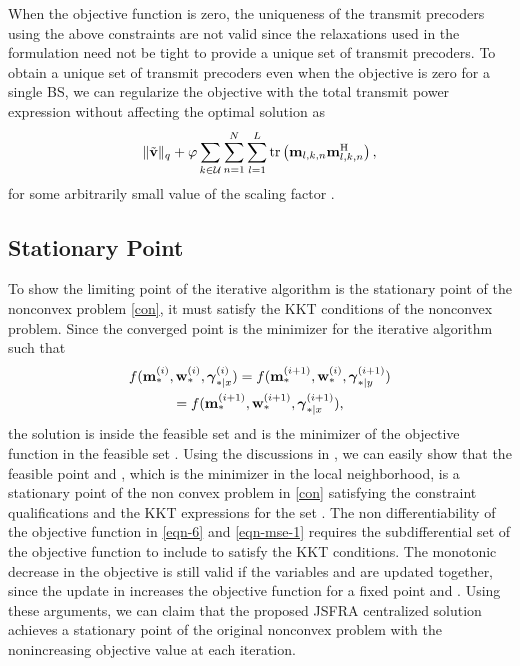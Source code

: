 When the objective function is zero, the uniqueness of the transmit precoders using the above constraints are not valid since the relaxations used in the formulation need not be tight to provide a unique set of transmit precoders. To obtain a unique set of transmit precoders even when the objective is zero for a single \ac{BS}, we can regularize the objective with the total transmit power expression without affecting the optimal solution as 
\begin{equation*}
\| \tilde{\mathbf{v}} \|_q + \varphi \sum_{k \in \mathcal{U}} \sum_{n = 1}^{N} \sum_{l=1}^{L} \mathrm{tr} \left ( \mathbf{m}_{l,k,n} \mathbf{m}^{\mathrm{H}}_{l,k,n} \right ),
\end{equation*}
for some arbitrarily small value of the scaling factor . 

\subsection{Stationary Point}

To show the limiting point of the iterative algorithm is the stationary point of the nonconvex problem \eqref{con}, it must satisfy the \ac{KKT} conditions of the nonconvex problem. Since the converged point is the minimizer for the iterative algorithm such that 
\begin{multline} \label{con-opt}
f(\iter{\mx}{\ast}{i},\iter{\my}{\ast}{i},\iter{\mz}{\ast|x}{i}) = f(\iter{\mx}{\ast}{i+1},\iter{\my}{\ast}{i},\iter{\mz}{\ast|y}{i+1}) \\ = 
f(\iter{\mx}{\ast}{i+1},\iter{\my}{\ast}{i+1},\iter{\mz}{\ast|x}{i+1}),
\end{multline}
the solution is inside the feasible set  and  is the minimizer of the objective function  in the feasible set . Using the discussions in \cite{marks1978technical}, we can easily show that the feasible point  and , which is the minimizer in the local neighborhood, is a stationary point of the non convex problem in \eqref{con} satisfying the constraint qualifications and the \ac{KKT} expressions for the set . The non differentiability of the objective function in \eqref{eqn-6} and \eqref{eqn-mse-1} requires the subdifferential set of the objective function to include  to satisfy the \ac{KKT} conditions. The monotonic decrease in the objective is still valid if the variables \me{\mx,\my} and \me{\mz} are updated together, since the update in \me{\my} increases the objective function for a fixed point \me{\mx} and \me{\mz}. Using these arguments, we can claim that the proposed \ac{JSFRA} centralized solution achieves a stationary point of the original nonconvex problem with the nonincreasing objective value at each iteration. 









